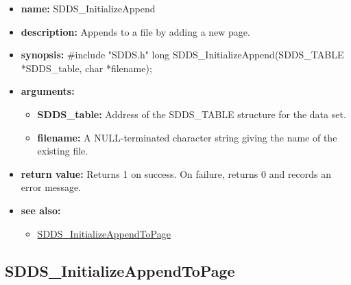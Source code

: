 \documentclass[11pt]{article}
\newcommand{\progref}[1]{\hyperref{SDDS_#1}{{\tt SDDS\_#1} (}{)}{SDDS_#1}}
\begin{document}
\begin{itemize}
\item {\bf name:}\newline
SDDS\_InitializeAppend
\item {\bf description:}\newline
Appends to a file by adding a new page.
\item {\bf synopsis:} \#include "SDDS.h"\newline
long SDDS\_InitializeAppend(SDDS\_TABLE *SDDS\_table, char *filename);
\item {\bf arguments:}
\begin{itemize}
\item {\bf SDDS\_table:} Address of the SDDS\_TABLE structure for the data set.
\item {\bf filename:} A NULL-terminated character string giving the name of the existing file.
\end{itemize}
\item {\bf return value:}\newline
Returns 1 on success. On failure, returns 0 and records an error message.
\item {\bf see also:}
\begin{itemize}
\item \progref{InitializeAppendToPage}
\end{itemize}
\end{itemize}

\subsection{SDDS\_InitializeAppendToPage}
\label{SDDS_InitializeAppendToPage}
\end{document}
